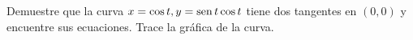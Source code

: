 \item Demuestre que la curva $x = \cos t, y = \operatorname{sen} t \cos t$ tiene dos tangentes en $(0, 0)$ y encuentre sus ecuaciones. Trace la gráfica de la curva.
